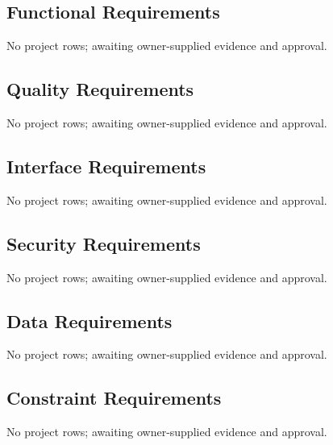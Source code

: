 \subsection{Functional Requirements}
\label{Table:FunctionalRequirements}
No project rows; awaiting owner-supplied evidence and approval.
\subsection{Quality Requirements}
\label{Table:QualityRequirements}
No project rows; awaiting owner-supplied evidence and approval.
\subsection{Interface Requirements}
\label{Table:InterfaceRequirements}
No project rows; awaiting owner-supplied evidence and approval.
\subsection{Security Requirements}
\label{Table:SecurityRequirements}
No project rows; awaiting owner-supplied evidence and approval.
\subsection{Data Requirements}
\label{Table:DataRequirements}
No project rows; awaiting owner-supplied evidence and approval.
\subsection{Constraint Requirements}
\label{Table:ConstraintRequirements}
No project rows; awaiting owner-supplied evidence and approval.
